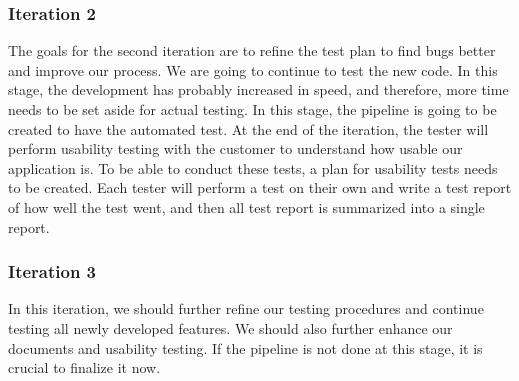 \subsubsection{Iteration 2}
The goals for the second iteration are to refine the test plan to find bugs better and improve our process. We are going to continue to test the new code. In this stage, the development has probably increased in speed, and therefore, more time needs to be set aside for actual testing. In this stage, the pipeline is going to be created to have the automated test. At the end of the iteration, the tester will perform usability testing with the customer to understand how usable our application is. To be able to conduct these tests, a plan for usability tests needs to be created. Each tester will perform a test on their own and write a test report of how well the test went, and then all test report is summarized into a single report.
 
\subsubsection{Iteration 3}
In this iteration, we should further refine our testing procedures and continue testing all newly developed features. We should also further enhance our documents and usability testing. If the pipeline is not done at this stage, it is crucial to finalize it now. 


